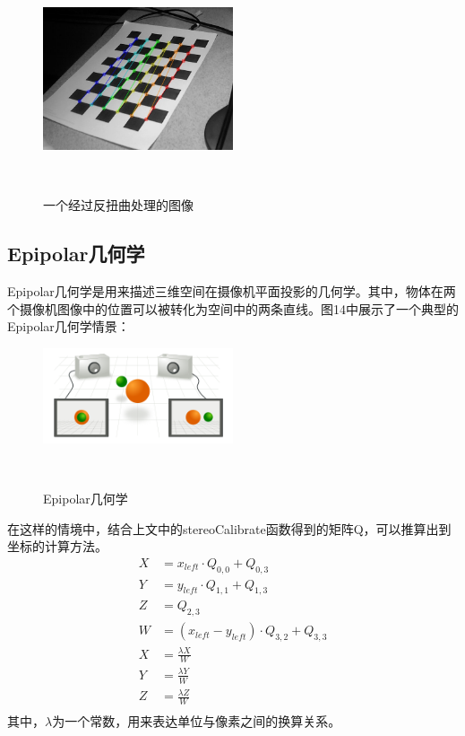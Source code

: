 \begin{figure}[h!]

  \centering
    \includegraphics[width=0.5\textwidth]{../src/proc_2014-02-24-225333.jpg}
    \caption{一个经过反扭曲处理的图像}\\
\end{figure}
\subsection{Epipolar几何学}
Epipolar几何学是用来描述三维空间在摄像机平面投影的几何学。其中，物体在两个摄像机图像中的位置可以被转化为空间中的两条直线。图14中展示了一个典型的Epipolar几何学情景：\\
\begin{figure}[h!]

  \centering
    \includegraphics[width=0.5\textwidth]{../Pictures/geo.png}
    \caption{Epipolar几何学}\\
\end{figure}
在这样的情境中，结合上文中的stereoCalibrate函数得到的矩阵Q，可以推算出到坐标的计算方法。
\begin{align}
X &= x_{left} \cdot Q_{0, 0} + Q_{0, 3}\\
Y &= y_{left} \cdot Q_{1, 1} + Q_{1, 3}\\
Z &= Q_{2, 3}\\
W &= (x_{left}-y_{left}) \cdot Q_{3, 2} + Q_{3, 3}\\
X &= \frac{\lambda X}{W}\\
Y &= \frac{\lambda Y}{W}\\
Z &= \frac{\lambda Z}{W}\\
\end{align}
其中，$\lambda$为一个常数，用来表达单位与像素之间的换算关系。